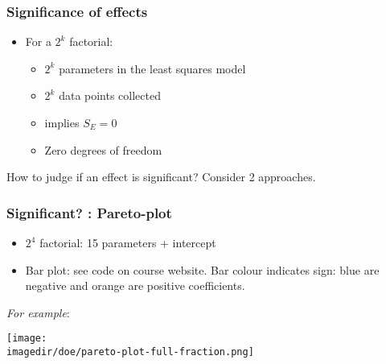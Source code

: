 \begin{frame}\frametitle{Significance of effects}
	\begin{itemize}
		\item	For a $2^k$ factorial:
		\begin{itemize}
			\item	$2^k$ parameters in the least squares model
			\item	$2^k$ data points collected
			\item	implies $S_E = 0$
			\item	Zero degrees of freedom
		\end{itemize}
	\end{itemize}

	How to judge if an effect is significant? Consider 2 approaches.
\end{frame}

\begin{frame}\frametitle{Significant? : Pareto-plot}
	\begin{itemize}
		\item	$2^4$ factorial: 15 parameters + intercept
		\item	Bar plot: see code on course website. Bar colour indicates sign: blue are negative and orange are positive coefficients.
	\end{itemize}
	

	\emph{For example}:
	\begin{center}
		\texttt{[image: \\imagedir/doe/pareto-plot-full-fraction.png]}
	\end{center}
\end{frame}

